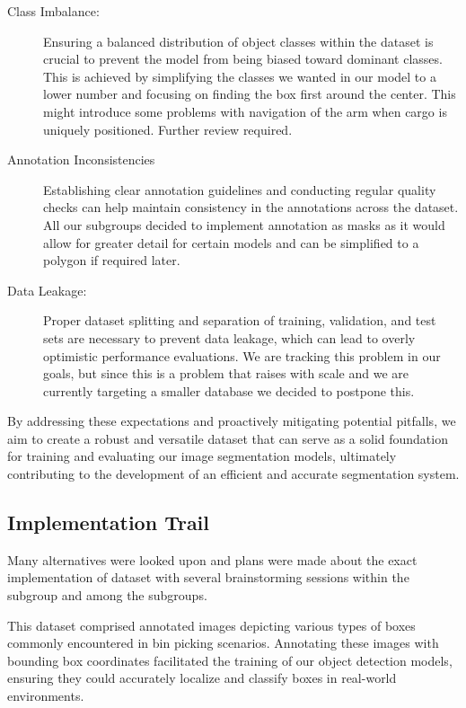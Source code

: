 \begin{description}
      \item[Class Imbalance:] Ensuring a balanced distribution of object classes within the dataset is crucial to prevent the model from being biased toward dominant classes. This is achieved by simplifying the classes we wanted in our model to a lower number and focusing on finding the box first around the center. This might introduce some problems with navigation of the arm when cargo is uniquely positioned. Further review required.
      \item[Annotation Inconsistencies] Establishing clear annotation guidelines and conducting regular quality checks can help maintain consistency in the annotations across the dataset. All our subgroups decided to implement annotation as masks as it would allow for greater detail for certain models and can be simplified to a polygon if required later.
      \item[Data Leakage:] Proper dataset splitting and separation of training, validation, and test sets are necessary to prevent data leakage, which can lead to overly optimistic performance evaluations. We are tracking this problem in our goals, but since this is a problem that raises with scale and we are currently targeting a smaller database we decided to postpone this.
\end{description}

By addressing these expectations and proactively mitigating potential pitfalls, we aim to create a robust and versatile dataset that can serve as a solid foundation for training and evaluating our image segmentation models, ultimately contributing to the development of an efficient and accurate segmentation system.

\subsection{Implementation Trail}
Many alternatives were looked upon and plans were made about the exact implementation of dataset with several brainstorming sessions within the subgroup and among the subgroups.

This dataset comprised annotated images depicting various types of boxes commonly encountered in bin picking scenarios. Annotating these images with bounding box coordinates facilitated the training of our object detection models, ensuring they could accurately localize and classify boxes in real-world environments.

